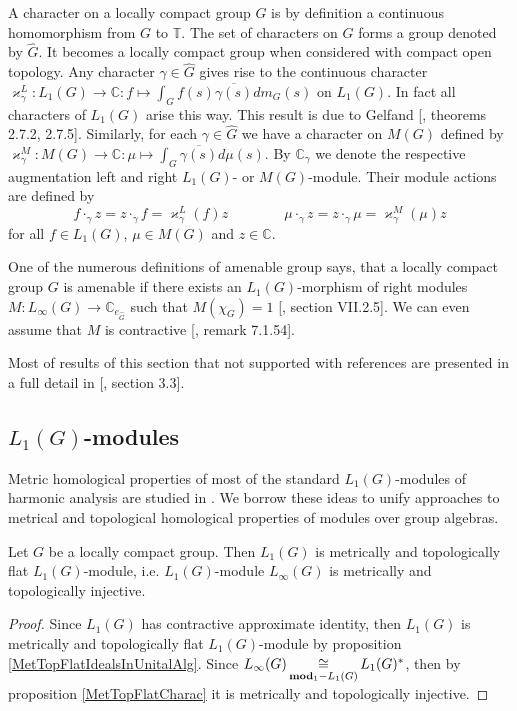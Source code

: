 A character on a locally compact group $G$ is by definition a continuous homomorphism from $G$ to $\mathbb{T}$. The set of characters on $G$ forms a group denoted by $\widehat{G}$. It becomes a locally compact group when considered with compact open topology. Any character $\gamma\in\widehat{G}$ gives rise to the continuous character $\varkappa_\gamma^L:L_1(G)\to\mathbb{C}:f\mapsto \int_G f(s)\overline{\gamma(s)}dm_G(s)$ on $L_1(G)$. In fact all characters of $L_1(G)$ arise this way. This result is due to Gelfand [\cite{KaniBanAlg}, theorems 2.7.2, 2.7.5]. Similarly, for each $\gamma\in\widehat{G}$ we have a character on $M(G)$ defined by $\varkappa_\gamma^M:M(G)\to\mathbb{C}:\mu\mapsto\int_{G} \overline{\gamma(s)}d\mu(s)$. By $\mathbb{C}_\gamma$ we denote the respective augmentation left and right $L_1(G)$- or $M(G)$-module. Their module actions are defined by
$$
f\cdot_{\gamma}z=z\cdot_{\gamma}f=\varkappa_\gamma^L(f)z
\qquad\qquad
\mu\cdot_{\gamma}z=z\cdot_{\gamma}\mu=\varkappa_\gamma^M(\mu)z
$$
for all $f\in L_1(G)$, $\mu\in M(G)$ and $z\in\mathbb{C}$. 

One of the numerous definitions of amenable group says, that a locally compact group $G$ is amenable if there exists an $L_1(G)$-morphism of right modules $M:L_\infty(G)\to\mathbb{C}_{e_{\widehat{G}}}$ such that $M(\chi_G)=1$ [\cite{HelBanLocConvAlg}, section VII.2.5]. We can even assume that $M$ is contractive [\cite{HelBanLocConvAlg}, remark 7.1.54].

Most of results of this section that not supported with references are presented in a full detail in [\cite{DalBanAlgAutCont}, section 3.3].


\subsection{\texorpdfstring{$L_1(G)$}{L1(G)}-modules}
\label{SubSectionL1GModules}

Metric homological properties of most of the standard $L_1(G)$-modules of harmonic analysis are studied in \cite{GravInjProjBanMod}. We borrow these ideas to unify approaches to metrical and topological homological properties of modules over group algebras.

\begin{proposition}\label{LInfIsL1MetrInj} Let $G$ be a locally compact group. Then $L_1(G)$ is metrically and topologically flat $L_1(G)$-module, i.e. $L_1(G)$-module $L_\infty(G)$ is metrically and topologically injective.
\end{proposition} 
\begin{proof} Since $L_1(G)$ has contractive approximate identity, then $L_1(G)$ is metrically and topologically flat $L_1(G)$-module by proposition \ref{MetTopFlatIdealsInUnitalAlg}. Since $L_\infty(G)\mathop{\mathbin{\cong}}\limits_{\mathbf{mod}_1-L_1(G)}L_1(G)^*$, then by proposition \ref{MetTopFlatCharac} it is metrically and topologically injective.
\end{proof}

